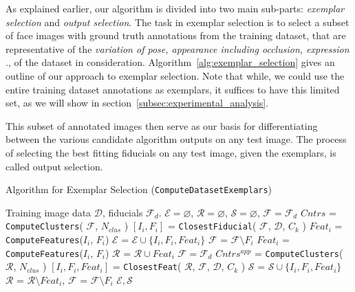 \label{subsec:algorithm_outline}
As explained earlier, our algorithm is divided into two main sub-parts: \emph{exemplar selection}
and \emph{output selection}.
The task in exemplar selection 
is to select a subset of face images with ground truth annotations from the training dataset, 
that are representative of the \emph{variation of pose, appearance including occlusion, expression}
\etc., of the dataset in consideration. Algorithm~\ref{alg:exemplar_selection} gives an outline
of our approach to exemplar selection. Note that while, we could use the entire training dataset
annotations as exemplars, it suffices to have this limited set, as we will show in
section~\ref{subsec:experimental_analysis}.

This subset of annotated images then serve as our basis for differentiating between
the various candidate algorithm outputs on any test image. The process of selecting 
the best fitting fiducials on any test image, given the exemplars, is called
output selection.

 \begin{algorithm}[!h]
  \caption{Algorithm for Exemplar Selection ({\tt ComputeDatasetExemplars})}
\begin{algorithmic}
  \INPUT Training image data $\mathcal{D}$, fiducials $\mathcal{F}_d$.
  \STATE $\mathcal{E} = \varnothing$, $\mathcal{R} = \varnothing$, $\mathcal{S} = \varnothing$, $\mathcal{F} = \mathcal{F}_d$
  \STATE $Cntrs$ = {\tt ComputeClusters}( $\mathcal{F}$, $N_{clus}$ )
    \STATE $[ I_i, F_i ]$ = {\tt ClosestFiducial}( $\mathcal{F}$, $\mathcal{D}$, $C_k$ )
    \STATE $Feat_i$ = {\tt ComputeFeatures}($I_i$, $F_i$)
    \STATE $\mathcal{E}$ = $\mathcal{E} \cup \{I_i, F_i, Feat_i\}$
    \STATE $\mathcal{F}$ = $\mathcal{F} \setminus F_i$
  \ENDFOR
    \STATE $Feat_i$ = {\tt ComputeFeatures}($I_i$, $F_i$)
    \STATE $\mathcal{R}$ = $\mathcal{R} \cup  Feat_i $
  \ENDFOR
  \STATE $\mathcal{F} = \mathcal{F}_d$
  \STATE $Cntrs^{app}$ = {\tt ComputeClusters}( $\mathcal{R}$, $N_{clus}$ )
    \STATE $[ I_i, F_i, Feat_i ]$ = {\tt ClosestFeat}( $\mathcal{R}$, $\mathcal{F}$, $\mathcal{D}$, $C_k$ )
    \STATE $\mathcal{S}$ = $\mathcal{S} \cup \{ I_i, F_i, Feat_i \}$
    \STATE $\mathcal{R}$ = $\mathcal{R} \setminus Feat_i $, \qquad $\mathcal{F}$ = $\mathcal{F} \setminus F_i $
  \ENDFOR
  \OUTPUT $\mathcal{E}, \mathcal{S}$
\end{algorithmic}
\label{alg:exemplar_selection}
\end{algorithm}
